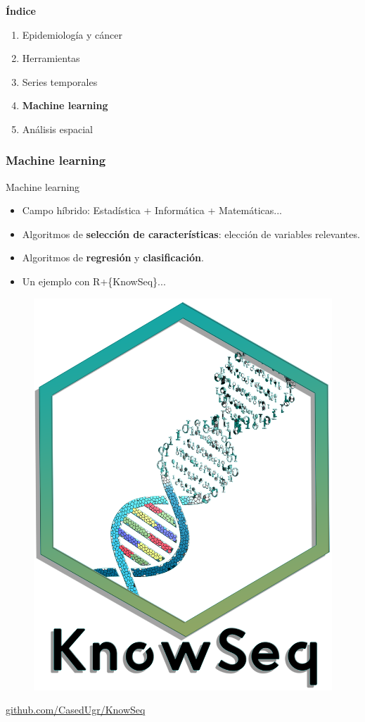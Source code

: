 \documentclass{beamer}
\begin{document}
\begin{frame}\frametitle{}
	
	\Large{\textbf{Índice}}\\[2ex]
	\normalsize
	\begin{enumerate}
		\item Epidemiología y cáncer\\[2ex]
		\item Herramientas\\[2ex]
		\item Series temporales \\[2ex]
		\item \textbf{Machine learning}  \\[2ex]
		\item Análisis espacial \\[2ex]
	\end{enumerate}
	
\end{frame}


\begin{frame}\frametitle{Machine learning}
	
	\begin{block}{Machine learning}
		\begin{itemize}
			\item Campo híbrido: Estadística + Informática + Matemáticas... \\[2ex]
			\item Algoritmos de \textbf{selección de características}: elección de variables relevantes.\\[2ex]
			\item Algoritmos de \textbf{regresión} y \textbf{clasificación}.\\[2ex]
			\item Un ejemplo con R+\{KnowSeq\}...
		\end{itemize}
		\begin{figure}
			\centering
			\includegraphics[width=.15\textwidth]{images/06_logo_knowseq.png}			
		\end{figure}
		\vspace{-10pt}
		\centering
		\url{github.com/CasedUgr/KnowSeq}
	\end{block}
	
\end{frame}
\end{document}
